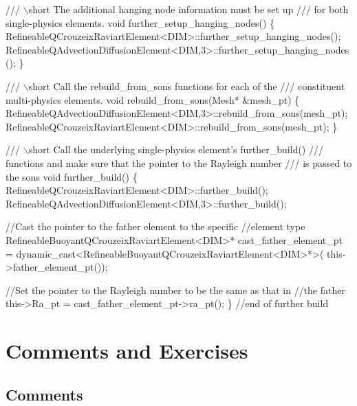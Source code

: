 
\begin{DoxyCodeInclude}
 \textcolor{comment}{/// \(\backslash\)short The additional hanging node information must be set up}
\textcolor{comment}{ /// for both single-physics elements.}
\textcolor{comment}{} \textcolor{keywordtype}{void} further\_setup\_hanging\_nodes()
  \{
   RefineableQCrouzeixRaviartElement<DIM>::further\_setup\_hanging\_nodes();
   RefineableQAdvectionDiffusionElement<DIM,3>::further\_setup\_hanging\_nodes();
  \}


 \textcolor{comment}{}
\textcolor{comment}{ /// \(\backslash\)short Call the rebuild\_from\_sons functions for each of the}
\textcolor{comment}{ /// constituent multi-physics elements.}
\textcolor{comment}{} \textcolor{keywordtype}{void} rebuild\_from\_sons(Mesh* &mesh\_pt) 
  \{
   RefineableQAdvectionDiffusionElement<DIM,3>::rebuild\_from\_sons(mesh\_pt);
   RefineableQCrouzeixRaviartElement<DIM>::rebuild\_from\_sons(mesh\_pt);
  \}
  

\textcolor{comment}{}
\textcolor{comment}{ /// \(\backslash\)short Call the underlying single-physics element's further\_build()}
\textcolor{comment}{ /// functions and make sure that the pointer to the Rayleigh number}
\textcolor{comment}{ /// is passed to the sons}
\textcolor{comment}{} \textcolor{keywordtype}{void} further\_build()
  \{
   RefineableQCrouzeixRaviartElement<DIM>::further\_build();
   RefineableQAdvectionDiffusionElement<DIM,3>::further\_build();

   \textcolor{comment}{//Cast the pointer to the father element to the specific}
   \textcolor{comment}{//element type}
   RefineableBuoyantQCrouzeixRaviartElement<DIM>* cast\_father\_element\_pt
    = \textcolor{keyword}{dynamic\_cast<}RefineableBuoyantQCrouzeixRaviartElement<DIM>*\textcolor{keyword}{>}(
     this->father\_element\_pt());

   \textcolor{comment}{//Set the pointer to the Rayleigh number to be the same as that in}
   \textcolor{comment}{//the father}
   this->Ra\_pt = cast\_father\_element\_pt->ra\_pt();
  \} \textcolor{comment}{//end of further build}

\end{DoxyCodeInclude}




 

\hypertarget{index_comm_and_exercises}{}\section{Comments and Exercises}\label{index_comm_and_exercises}
\hypertarget{index_comments}{}\subsection{Comments}\label{index_comments}


